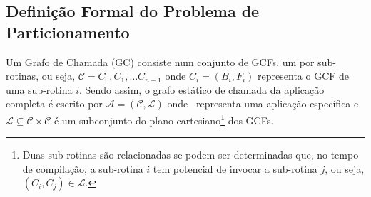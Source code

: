     \subsection{Definição Formal do Problema de Particionamento \HS} \label{sec:gc}
        Um Grafo de Chamada (GC) consiste num conjunto de GCFs, um por sub-rotinas, ou seja, $\mathcal{C} = {C_0, C_1, \dots C_{n-1}}$
        onde $ C_i = (B_i, F_i) $ representa o GCF de uma sub-rotina $ i $. %
        Sendo assim, o grafo estático de chamada da aplicação completa é escrito por $\mathcal{A} = (\mathcal{C}, \mathcal{L}) \label{eq:a}$
        onde \A\ representa uma aplicação específica e $ \mathcal{L} \subseteq \mathcal{C} \times \mathcal{C} $ é um subconjunto do plano cartesiano\footnote{Duas sub-rotinas são relacionadas se podem ser determinadas que, no tempo de compilação, a sub-rotina $ i $ tem potencial de invocar a sub-rotina $ j $, ou seja, $ (C_i, C_j) \in \mathcal{L} $.} dos GCFs.
        
        

